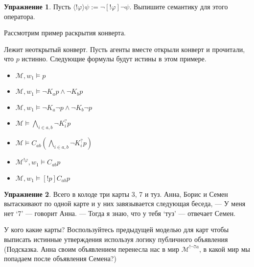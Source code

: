 \documentclass[openany]{book}
\theoremstyle{plain}
\theoremstyle{definition}
\newtheorem{xrc}{Упражнение}[]
\begin{document}
\begin{xrc}
Пусть \(\langle ! \varphi \rangle \psi := \neg [!\varphi] \neg \psi\). Выпишите семантику для этого оператора.
\end{xrc}

Рассмотрим пример раскрытия конверта.

\begin{figure}
\centering
{}
\end{figure}

Лежит неоткрытый конверт. Пусть агенты вместе открыли конверт и прочитали, что \(p\) истинно. Следующие формулы будут истины в этом примере. 
\begin{itemize}
\item \(\mathcal{M}, w_1 \models p\)
\item \(\mathcal{M}, w_1 \models \neg K_a p \land \neg K_b p\)
\item \(\mathcal{M}, w_1 \models \neg K_a \neg p \land \neg K_b \neg p\)
\item \(\mathcal{M} \models \bigwedge\limits_{i\in{a,b}} \neg K_i^? p\)
\item \(\mathcal{M} \models C_{ab} \left(\bigwedge\limits_{i \in {a,b}} \neg K_i^? p \right)\)
\item \(\mathcal{M}^{!\varphi}, w_1 \models C_{ab} p\)
\item \(\mathcal{M}, w_1 \models [!p] C_{ab} p\)
\end{itemize}

\begin{xrc}
Всего в колоде три карты 3, 7 и туз. Анна, Борис и Семен вытаскивают по одной карте и у них завязывается следующая беседа,
--- У меня нет `7' --- говорит Анна.
--- Тогда я знаю, что у тебя `туз' --- отвечает Семен.

У кого какие карты? Воспользуйтесь предыдущей моделью для карт чтобы выписать истинные утверждения используя логику публичного объявления (Подсказка. Анна своим объявлением перенесла нас в мир \(\mathcal{M}^{! \neg 7a}\), в какой мир мы попадаем после объявления Семена?)
\end{xrc}
\end{document}
